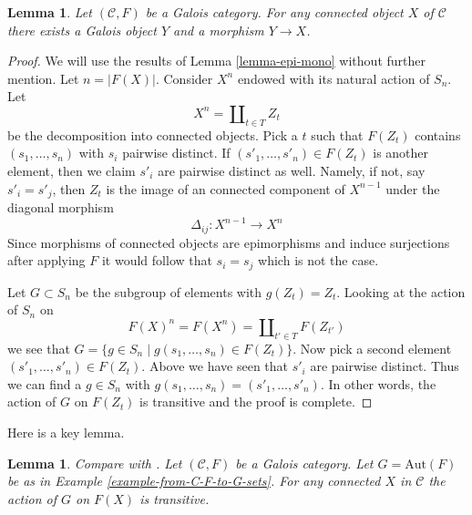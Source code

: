 \documentclass{stacks-project}
\newenvironment{reference}{\comment}{\endcomment}
\theoremstyle{plain}
\newtheorem{lemma}[subsection]{Lemma}
\theoremstyle{definition}
\theoremstyle{remark}
\numberwithin{equation}{subsection}
\begin{document}
\begin{lemma}
\label{lemma-galois}
Let $(\mathcal{C}, F)$ be a Galois category. For any connected object $X$
of $\mathcal{C}$ there exists a Galois object $Y$ and a morphism $Y \to X$.
\end{lemma}

\begin{proof}
We will use the results of Lemma \ref{lemma-epi-mono} without further mention.
Let $n = |F(X)|$. Consider $X^n$ endowed with its natural action of
$S_n$. Let
$$
X^n = \coprod\nolimits_{t \in T} Z_t
$$
be the decomposition into connected objects. Pick a $t$ such that
$F(Z_t)$ contains $(s_1, \ldots, s_n)$ with $s_i$ pairwise distinct.
If $(s'_1, \ldots, s'_n) \in F(Z_t)$ is another element, then we
claim $s'_i$ are pairwise distinct as well. Namely, if not, say
$s'_i = s'_j$, then $Z_t$ is the image of an connected component of
$X^{n - 1}$ under the diagonal morphism
$$
\Delta_{ij} : X^{n - 1} \longrightarrow X^n
$$
Since morphisms of connected objects are epimorphisms and induce
surjections after applying $F$ it would follow that $s_i = s_j$
which is not the case.

\medskip\noindent
Let $G \subset S_n$ be the subgroup of elements with $g(Z_t) = Z_t$.
Looking at the action of $S_n$ on
$$
F(X)^n = F(X^n) = \coprod\nolimits_{t' \in T} F(Z_{t'})
$$
we see that $G = \{g \in S_n \mid g(s_1, \ldots, s_n) \in F(Z_t)\}$.
Now pick a second element $(s'_1, \ldots, s'_n) \in F(Z_t)$.
Above we have seen that $s'_i$ are pairwise distinct. Thus we can
find a $g \in S_n$ with $g(s_1, \ldots, s_n) = (s'_1, \ldots, s'_n)$.
In other words, the action of $G$ on $F(Z_t)$ is transitive and
the proof is complete.
\end{proof}

\noindent
Here is a key lemma.

\begin{lemma}
\label{lemma-tame}
\begin{reference}
Compare with \cite[Definition 7.2.4]{BS}.
\end{reference}
Let $(\mathcal{C}, F)$ be a Galois category. Let $G = \text{Aut}(F)$
be as in Example \ref{example-from-C-F-to-G-sets}. For any connected
$X$ in $\mathcal{C}$ the action of $G$ on $F(X)$ is transitive.
\end{lemma}
\end{document}
